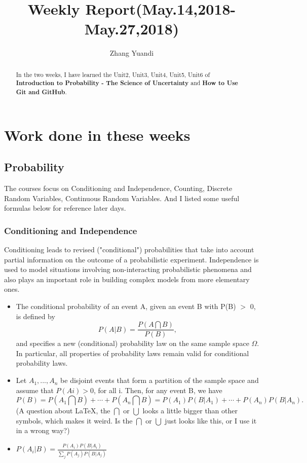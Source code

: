 \documentclass{article}
\title{Weekly Report(May.14,2018-May.27,2018)}
\author{Zhang Yuandi}
\begin{document}
\maketitle

\begin{abstract}
In the two weeks, I have learned the Unit2, Unit3, Unit4, Unit5, Unit6 of \textbf{Introduction to Probability - The Science of Uncertainty} and \textbf{How to Use Git and GitHub}.
\end{abstract}
\section{Work done in these weeks}
\subsection{Probability}

The courses focus on Conditioning and Independence, Counting, Discrete Random Variables, Continuous Random Variables. And I listed some useful formulas below for reference later days.
\subsubsection{Conditioning and Independence}

Conditioning leads to revised ("conditional") probabilities that take into account partial information on the outcome of a probabilistic experiment. Independence is used to model situations involving non-interacting probabilistic phenomena and also plays an important role in building complex models from more elementary ones.
\begin{itemize}
\item

The conditional probability of an event A, given an event B with P(B) $>$ 0, is defined by\[P(A|B)=\frac{P(A\bigcap B)}{P(B)},\]and specifies a new (conditional) probability law on the same sample space $\Omega$. In particular, all properties of probability laws remain valid for conditional probability laws.
\item

Let $A_1,...,A_n$ be disjoint events that form a partition of the sample space and assume that $P(Ai)>0$, for all i. Then, for any event B, we have \[P(B) = P(A_1\bigcap B)+\cdots+P(A_n\bigcap B) = P(A_1)P(B|A_1)+\cdots+P(A_n)P(B|A_n).\](A question about \LaTeX, the $\bigcap$ or $\bigcup$ looks a little bigger than other symbols, which makes it weird. Is the $\bigcap$ or $\bigcup$ just looks like this, or I use it in a wrong way?)

\item
$P(A_i|B)=\frac{P(A_i)P(B|A_i)}{\sum_j P(A_j)P(B|A_j)}$

\end{itemize}
\end{document}
